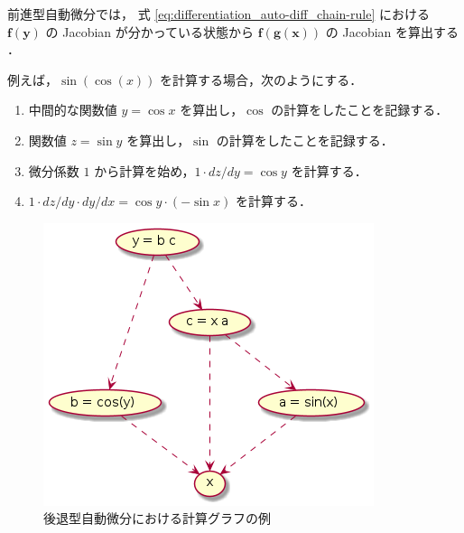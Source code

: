 前進型自動微分では，
式 \eqref{eq:differentiation_auto-diff_chain-rule} における
$\bm{f}(\bm{y})$ の Jacobian が分かっている状態から
$\bm{f}(\bm{g}(\bm{x}))$ の Jacobian を算出する
\cite{Kubota1998}．

例えば，$\sin(\cos(x))$ を計算する場合，次のようにする．

\begin{enumerate}
    \item 中間的な関数値 $y = \cos{x}$ を算出し，$\cos$ の計算をしたことを記録する．
    \item 関数値 $z = \sin{y}$ を算出し，$\sin$ の計算をしたことを記録する．
    \item 微分係数 $1$ から計算を始め，$1 \cdot dz/dy = \cos{y}$ を計算する．
    \item $1 \cdot dz/dy \cdot dy/dx = \cos{y} \cdot (-\sin{x})$ を計算する．
\end{enumerate}

\begin{figure}[tp]
    \centering
    \includegraphics[width=0.5\linewidth]{differentiation/auto-diff-backward/example-nodes.png}
    \caption{後退型自動微分における計算グラフの例}
    \label{fig:differentiation_auto-diff_backward-nodes-example}
\end{figure}

